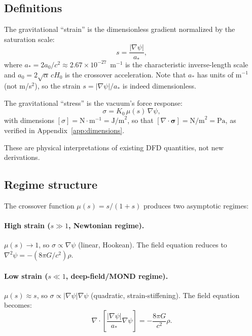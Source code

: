 \documentclass[aps,prd,twocolumn,superscriptaddress,nofootinbib]{revtex4-2}
\begin{document}
\subsection{Definitions}

The gravitational ``strain'' is the dimensionless gradient normalized
by the saturation scale:
\begin{equation}
s = \frac{|\nabla\psi|}{a_*},
\label{eq:strain}
\end{equation}
where $a_* = 2a_0/c^2 \approx 2.67 \times 10^{-27}$~m$^{-1}$ is the
characteristic inverse-length scale and
$a_0 = 2\sqrt{\alpha}\,cH_0$ is the crossover acceleration.
Note that $a_*$ has units of m$^{-1}$ (not m/s$^2$), so the strain
$s = |\nabla\psi|/a_*$ is indeed dimensionless.

The gravitational ``stress'' is the vacuum's force response:
\begin{equation}
\sigma = K_0\,\mu(s)\,\nabla\psi,
\label{eq:stress}
\end{equation}
with dimensions $[\sigma] = \text{N}\cdot\text{m}^{-1}
= \text{J/m}^2$, so that
$[\nabla\cdot\bm{\sigma}] = \text{N/m}^2 = \text{Pa}$,
as verified in Appendix~\ref{app:dimensions}.

These are physical interpretations of existing DFD quantities, not new
derivations.

\subsection{Regime structure}

The crossover function $\mu(s) = s/(1+s)$ produces two asymptotic
regimes:

\paragraph{High strain ($s \gg 1$, Newtonian regime).}
$\mu(s) \to 1$, so $\sigma \propto \nabla\psi$ (linear, Hookean).
The field equation reduces to $\nabla^2\psi = -(8\pi G/c^2)\rho$.

\paragraph{Low strain ($s \ll 1$, deep-field/MOND regime).}
$\mu(s) \approx s$, so $\sigma \propto |\nabla\psi|\nabla\psi$
(quadratic, strain-stiffening).  The field equation becomes:
\begin{equation}
\nabla\cdot\left[\frac{|\nabla\psi|}{a_*}\nabla\psi\right]
= -\frac{8\pi G}{c^2}\rho.
\end{equation}
\end{document}
